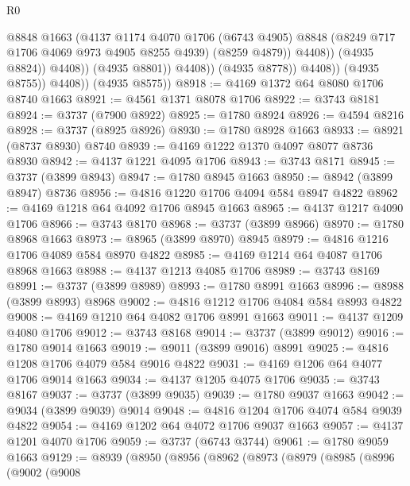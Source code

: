 \begin{lexlean}{R0}
\begin{coremodule}
                                  @8848
                                  @1663
                                  (@4137
                                    @1174
                                    @4070
                                    @1706
                                    (@6743 @4905)
                                    @8848
                                    (@8249 @717 @1706 @4069 @973 @4905 @8255 @4939)
                                    (@8259 @4879))
                                  @4408))
                              (@4935 @8824))
                            @4408))
                        (@4935 @8801))
                      @4408))
                  (@4935 @8778))
                @4408))
            (@4935 @8755))
          @4408))
      (@4935 @8575))
@8918 := @4169 @1372 @64 @8080 @1706 @8740 @1663
@8921 := @4561 @1371 @8078 @1706
@8922 := @3743 @8181
@8924 := @3737 (@7900 @8922)
@8925 := @1780 @8924
@8926 := @4594 @8216
@8928 := @3737 (@8925 @8926)
@8930 := @1780 @8928 @1663
@8933 := @8921 (@8737 @8930) @8740
@8939 := @4169 @1222 @1370 @4097 @8077 @8736 @8930
@8942 := @4137 @1221 @4095 @1706
@8943 := @3743 @8171
@8945 := @3737 (@3899 @8943)
@8947 := @1780 @8945 @1663
@8950 := @8942 (@3899 @8947) @8736
@8956 := @4816 @1220 @1706 @4094 @584 @8947 @4822
@8962 := @4169 @1218 @64 @4092 @1706 @8945 @1663
@8965 := @4137 @1217 @4090 @1706
@8966 := @3743 @8170
@8968 := @3737 (@3899 @8966)
@8970 := @1780 @8968 @1663
@8973 := @8965 (@3899 @8970) @8945
@8979 := @4816 @1216 @1706 @4089 @584 @8970 @4822
@8985 := @4169 @1214 @64 @4087 @1706 @8968 @1663
@8988 := @4137 @1213 @4085 @1706
@8989 := @3743 @8169
@8991 := @3737 (@3899 @8989)
@8993 := @1780 @8991 @1663
@8996 := @8988 (@3899 @8993) @8968
@9002 := @4816 @1212 @1706 @4084 @584 @8993 @4822
@9008 := @4169 @1210 @64 @4082 @1706 @8991 @1663
@9011 := @4137 @1209 @4080 @1706
@9012 := @3743 @8168
@9014 := @3737 (@3899 @9012)
@9016 := @1780 @9014 @1663
@9019 := @9011 (@3899 @9016) @8991
@9025 := @4816 @1208 @1706 @4079 @584 @9016 @4822
@9031 := @4169 @1206 @64 @4077 @1706 @9014 @1663
@9034 := @4137 @1205 @4075 @1706
@9035 := @3743 @8167
@9037 := @3737 (@3899 @9035)
@9039 := @1780 @9037 @1663
@9042 := @9034 (@3899 @9039) @9014
@9048 := @4816 @1204 @1706 @4074 @584 @9039 @4822
@9054 := @4169 @1202 @64 @4072 @1706 @9037 @1663
@9057 := @4137 @1201 @4070 @1706
@9059 := @3737 (@6743 @3744)
@9061 := @1780 @9059 @1663
@9129 := @8939
    (@8950
      (@8956
        (@8962
          (@8973
            (@8979
              (@8985
                (@8996
                  (@9002
                    (@9008

\end{coremodule}
\end{lexlean}
